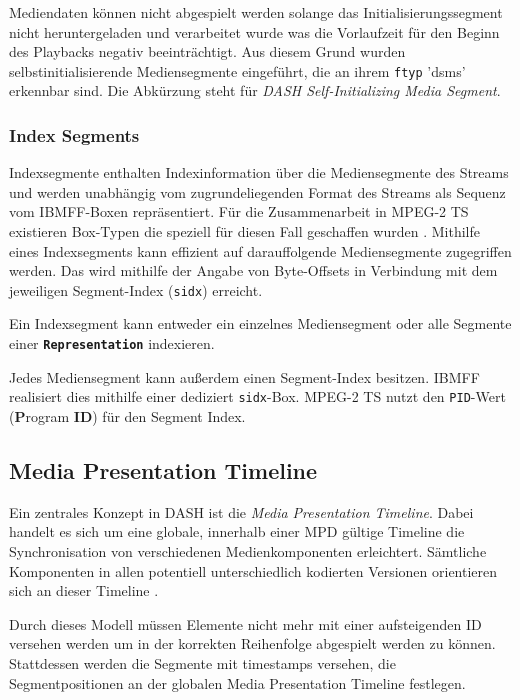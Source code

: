 \documentclass[paper = a4, fontsize = 12pt, parskip = half]{scrartcl} %
\def\attr#1{\texttt{#1}}
\def\elem#1{\texttt{\textbf{#1}}}
\begin{document}
Mediendaten können nicht abgespielt werden solange das Initialisierungssegment nicht heruntergeladen und verarbeitet wurde was die Vorlaufzeit für den Beginn des Playbacks negativ beeinträchtigt. Aus diesem Grund wurden selbstinitialisierende Mediensegmente eingeführt, die an ihrem \attr{ftyp} 'dsms' erkennbar sind. Die Abkürzung steht für \textit{DASH Self-Initializing Media Segment}.

\subsubsection{Index Segments}
Indexsegmente enthalten Indexinformation über die Mediensegmente des Streams und werden unabhängig vom zugrundeliegenden Format des Streams als Sequenz vom IBMFF-Boxen repräsentiert. Für die Zusammenarbeit in MPEG-2 TS existieren Box-Typen die speziell für diesen Fall geschaffen wurden \cite{international_organization_for_standardization_isoiec_nodate}.
Mithilfe eines Indexsegments kann effizient auf darauffolgende Mediensegmente zugegriffen werden. Das wird mithilfe der Angabe von Byte-Offsets in Verbindung mit dem jeweiligen Segment-Index (\attr{sidx}) erreicht.

Ein Indexsegment kann entweder ein einzelnes Mediensegment oder alle Segmente einer \elem{Representation} indexieren.

Jedes Mediensegment kann außerdem einen Segment-Index besitzen. IBMFF realisiert dies mithilfe einer dediziert \attr{sidx}-Box. MPEG-2 TS nutzt den \attr{PID}-Wert (\textbf{P}rogram \textbf{ID}) für den Segment Index. 

\subsection{Media Presentation Timeline}
Ein zentrales Konzept in DASH ist die \textit{Media Presentation Timeline}. Dabei handelt es sich um eine globale, innerhalb einer MPD gültige Timeline die Synchronisation von verschiedenen Medienkomponenten erleichtert. Sämtliche Komponenten in allen potentiell unterschiedlich kodierten Versionen orientieren sich an dieser Timeline \cite{international_organization_for_standardization_isoiec_nodate}.

Durch dieses Modell müssen Elemente nicht mehr mit einer aufsteigenden ID versehen werden um in der korrekten Reihenfolge abgespielt werden zu können. Stattdessen werden die Segmente mit timestamps versehen, die Segmentpositionen an der globalen Media Presentation Timeline festlegen.
\end{document}

